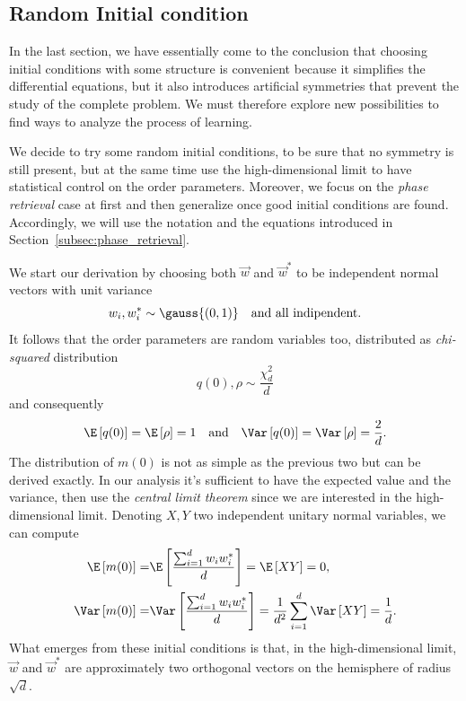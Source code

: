 \subsection{Random Initial condition} \label{subsec:random-initial-conditions}
In the last section, we have essentially come to the conclusion that
choosing initial conditions with some structure is convenient
because it simplifies the differential equations,
but it also introduces artificial symmetries that prevent the study of the complete problem.
We must therefore explore new possibilities to find ways to analyze the process of learning.

We decide to try some random initial conditions, to be sure that no symmetry is still present,
but at the same time use the high-dimensional limit to have statistical control on the 
order parameters. Moreover, we focus on the \emph{phase retrieval} case at first 
and then generalize once good initial conditions are found.
Accordingly, we will use the notation and the equations introduced in Section~\ref{subsec:phase_retrieval}.

We start our derivation by choosing both \(\vec{w}\) and \(\vec{w}^*\) to be independent normal
vectors with unit variance
\[
  w_{i}, w^*_{i} \sim \gauss{(0,1)}\quad\text{and all indipendent.}
\]
It follows that the order parameters are random variables too, distributed as
\emph{chi-squared} distribution
\[
  q(0),\rho \sim \frac{\chi^2_d}{d}
\]
and consequently 
\[
  \E\left[q(0)\right] = \E\left[\rho\right] = 1 \quad\text{and}\quad
  \Var\left[q(0)\right] = \Var\left[\rho\right] = \frac{2}{d}.
\]
The distribution of \(m{(0)}\) is not as simple as the previous two but can be derived exactly.
In our analysis it's sufficient to have the expected value and the variance, then use the 
\emph{central limit theorem} since we are interested in the high-dimensional limit.
Denoting \(X,Y\) two independent unitary normal variables, we can compute
\[\begin{split}
  \E\left[m{(0)}\right] =& \E\left[\frac{\sum_{i=1}^d w_iw^*_i}{d}\right] = \E\left[XY\right] = 0, \\
  \Var\left[m{(0)}\right] =& \Var\left[\frac{\sum_{i=1}^d w_iw^*_i}{d}\right]
    = \frac{1}{d^2}\sum_{i=1}^d \Var\left[XY\right] = \frac{1}{d}.
\end{split}\]
What emerges from these initial conditions is that, in the high-dimensional limit,
\(\vec{w}\) and \(\vec{w}^*\) are approximately two orthogonal vectors on the hemisphere of radius \(\sqrt{d}\).

